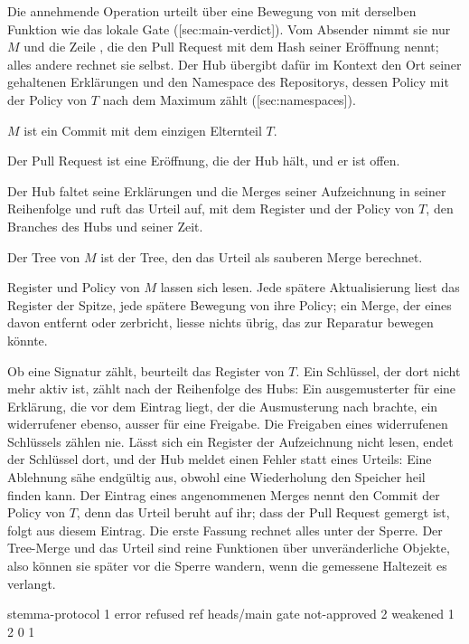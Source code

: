 Die annehmende Operation urteilt über eine Bewegung von  mit derselben Funktion wie
das lokale Gate ([sec:main-verdict]).
Vom Absender nimmt sie nur $M$ und die Zeile , die den Pull Request mit dem Hash
seiner Eröffnung nennt; alles andere rechnet sie selbst.
Der Hub übergibt dafür im Kontext den Ort seiner gehaltenen Erklärungen und den Namespace des
Repositorys, dessen Policy mit der Policy von $T$ nach dem Maximum zählt
([sec:namespaces]).

\startitemize[n]
\item $M$ ist ein Commit mit dem einzigen Elternteil $T$.
\item Der Pull Request ist eine Eröffnung, die der Hub hält, und er ist offen.
\item Der Hub faltet seine Erklärungen und die Merges seiner Aufzeichnung in seiner Reihenfolge
und ruft das Urteil auf, mit dem Register und der Policy von $T$, den Branches des Hubs und
seiner Zeit.
\item Der Tree von $M$ ist der Tree, den das Urteil als sauberen Merge berechnet.
\item Register und Policy von $M$ lassen sich lesen.
Jede spätere Aktualisierung liest das Register der Spitze, jede spätere Bewegung von 
ihre Policy; ein Merge, der eines davon entfernt oder zerbricht, liesse nichts übrig, das
 zur Reparatur bewegen könnte.
\stopitemize

Ob eine Signatur zählt, beurteilt das Register von $T$.
Ein Schlüssel, der dort nicht mehr aktiv ist, zählt nach der Reihenfolge des Hubs:
Ein ausgemusterter für eine Erklärung, die vor dem Eintrag liegt, der die Ausmusterung nach
 brachte, ein widerrufener ebenso, ausser für eine Freigabe.
Die Freigaben eines widerrufenen Schlüssels zählen nie.
Lässt sich ein Register der Aufzeichnung nicht lesen, endet der Schlüssel dort, und der Hub
meldet einen Fehler statt eines Urteils: Eine Ablehnung sähe endgültig aus, obwohl eine
Wiederholung den Speicher heil finden kann.
Der Eintrag eines angenommenen Merges nennt den Commit der Policy von $T$, denn das Urteil beruht
auf ihr; dass der Pull Request gemergt ist, folgt aus diesem Eintrag.
Die erste Fassung rechnet alles unter der Sperre.
Der Tree-Merge und das Urteil sind reine Funktionen über unveränderliche Objekte, also können sie
später vor die Sperre wandern, wenn die gemessene Haltezeit es verlangt.

\starttyping
stemma-protocol 1
error refused
ref heads/main gate not-approved 2 weakened 1 2 0 1
\stoptyping

